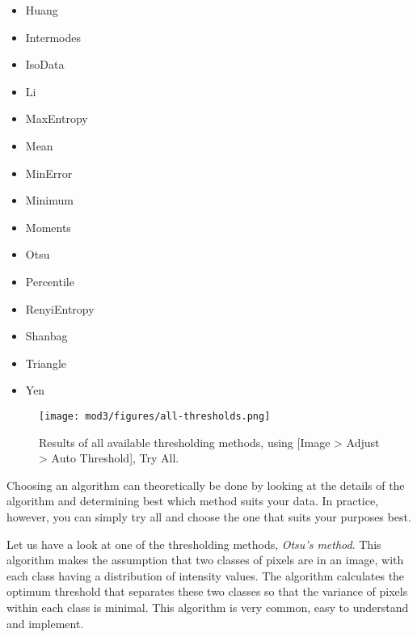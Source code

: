 \begin{itemize}
	\item Huang
	\item Intermodes
	\item IsoData
	\item Li
	\item MaxEntropy
	\item Mean
	\item MinError
	\item Minimum
	\item Moments
	\item Otsu
	\item Percentile
	\item RenyiEntropy
	\item Shanbag
	\item Triangle
	\item Yen
\end{itemize}

\begin{figure}[!ht]
	\centering
		\texttt{[image: mod3/figures/all-thresholds.png]}
	\caption{Results of all available thresholding methods, using [Image > Adjust > Auto Threshold], Try All. }
	\label{fig:all-thresholds}
\end{figure}

Choosing an algorithm can theoretically be done by looking at the details of the algorithm and determining best which method suits your data. In practice, however, you can simply try all and choose the one that suits your purposes best. 

Let us have a look at one of the thresholding methods, \emph{ Otsu's method}. This algorithm makes the assumption that two classes of pixels are in an image, with each class having a distribution of intensity values. The algorithm calculates the optimum threshold that separates these two classes so that the variance of pixels within each class is minimal. This algorithm is very common, easy to understand and implement. 

